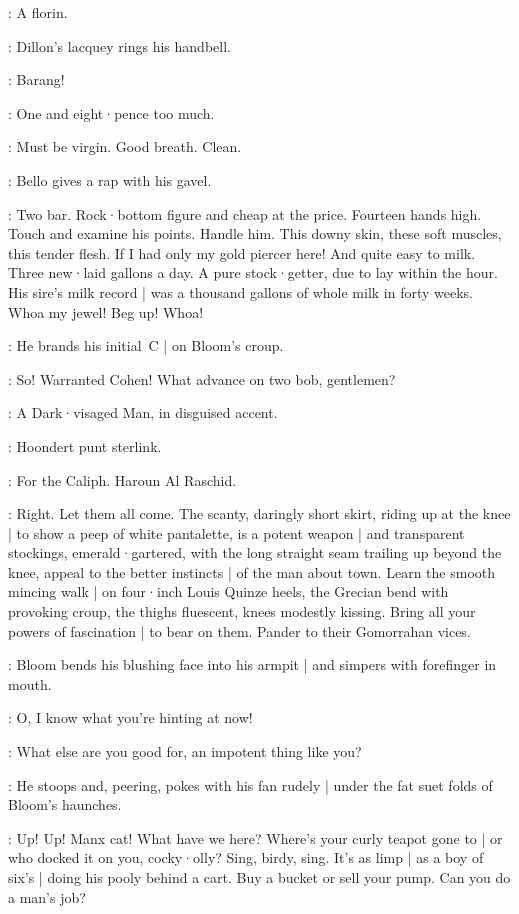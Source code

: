 \Bidder:
A florin.

:
Dillon's lacquey rings his handbell.

\Lacquey:
Barang!

\Voice:
One and eight·pence too much.

\Marsh[2b]:
Must be virgin.
Good breath.
Clean.

:
Bello gives a rap with his gavel.

\Bello:
Two bar.
Rock·bottom figure and cheap at the price.
Fourteen hands high.
Touch and examine his points.
Handle him.
This downy skin,
these soft muscles,
this tender flesh.
If I had only my gold piercer here!
And quite easy to milk.
Three new·laid gallons a day.
A pure stock·getter,
due to lay within the hour.
His sire's milk record |
was a thousand gallons of whole milk in forty weeks.
Whoa my jewel!
Beg up!
Whoa!

:
He brands his initial~C |
on Bloom's croup.

\Bello:
So!
Warranted Cohen!
What advance on two bob,
gentlemen?

:
A Dark·visaged Man,
in disguised accent.

\DarkvisagedMan:
Hoondert punt sterlink.

\Voices:
For the Caliph.
Haroun Al Raschid.

\Bello:
Right.
Let them all come.
The scanty,
daringly short skirt,
riding up at the knee |
to show a peep of white pantalette,
is a potent weapon |
and transparent stockings,
emerald·gartered,
with the long straight seam trailing up beyond the knee,
appeal to the better instincts |
of the  man about town.
Learn the smooth mincing walk |
on four·inch Louis Quinze heels,
the Grecian bend with provoking croup,
%
the thighs fluescent,
knees modestly kissing.
Bring all your powers of fascination |
to bear on them.
Pander to their Gomorrahan vices.

:
Bloom bends his blushing face into his armpit |
and simpers with forefinger in mouth.

\Bloom:
O,
I know what you're hinting at now!

\Bello:
What else are you good for,
an impotent thing like you?

:
He stoops and,
peering,
pokes with his fan rudely |
under the fat suet folds of Bloom's haunches.

\Bello:
Up!
Up!
Manx cat!
What have we here?
Where's your curly teapot gone to |
or who docked it on you,
cocky·olly?
Sing,
birdy,
sing.
%
It's as limp |
as a boy of six's |
doing his pooly behind a cart.
Buy a bucket or sell your pump.
Can you do a man's job?

